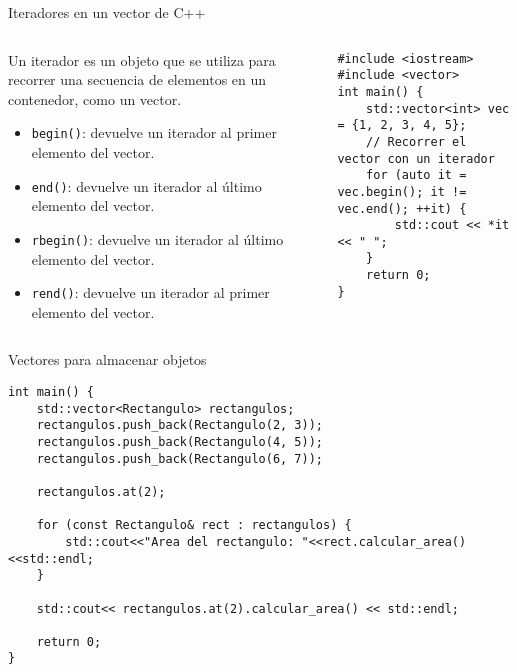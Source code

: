 \documentclass{beamer}
\begin{document}
\begin{frame}[fragile]{Iteradores en un vector de C++}

\begin{columns}
\begin{column}{0.5\textwidth}
Un iterador es un objeto que se utiliza para recorrer una secuencia de elementos en un contenedor, como un vector.

\begin{itemize}
    \item \texttt{begin()}: devuelve un iterador al primer elemento del vector.
    \item \texttt{end()}: devuelve un iterador al último elemento del vector.
    \item \texttt{rbegin()}: devuelve un iterador al último elemento del vector.
    \item \texttt{rend()}: devuelve un iterador al primer elemento del vector.
\end{itemize}

\end{column}

\begin{column}{0.5\textwidth}

\begin{verbatim}
#include <iostream>
#include <vector>
int main() {
    std::vector<int> vec = {1, 2, 3, 4, 5};
    // Recorrer el vector con un iterador
    for (auto it = vec.begin(); it != vec.end(); ++it) {
        std::cout << *it << " ";
    }
    return 0;
}
    \end{verbatim}
\end{column}
\end{columns}

\end{frame}


\begin{frame}[fragile]{Vectores para almacenar objetos}

\begin{verbatim}
int main() {
    std::vector<Rectangulo> rectangulos;
    rectangulos.push_back(Rectangulo(2, 3));
    rectangulos.push_back(Rectangulo(4, 5));
    rectangulos.push_back(Rectangulo(6, 7));

    rectangulos.at(2);
    
    for (const Rectangulo& rect : rectangulos) {
        std::cout<<"Area del rectangulo: "<<rect.calcular_area()<<std::endl;
    }

    std::cout<< rectangulos.at(2).calcular_area() << std::endl;

    return 0;
}

\end{verbatim}
\end{frame}
\end{document}
